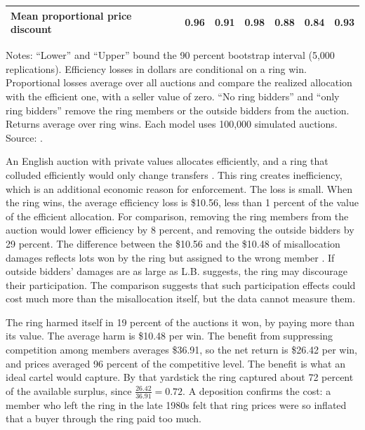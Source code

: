 \begin{table}[htbp]
\begin{threeparttable}
\begin{tabular}{@{}lrrrrrr@{}}
Mean proportional price discount & 0.96 & 0.91 & 0.98 & 0.88 & 0.84 & 0.93 \\
\bottomrule
\end{tabular}
\begin{tablenotes}\footnotesize
\item Notes: ``Lower'' and ``Upper'' bound the 90 percent bootstrap interval (5,000 replications). Efficiency
losses in dollars are conditional on a ring win. Proportional losses average over all auctions and compare the
realized allocation with the efficient one, with a seller value of zero. ``No ring bidders'' and ``only ring
bidders'' remove the ring members or the outside bidders from the auction. Returns average over ring wins. Each
model uses 100,000 simulated auctions. Source: \citet[Tables 8--10]{Asker2010}.
\end{tablenotes}
\end{threeparttable}
\end{table}

An English auction with private values allocates efficiently, and a ring that colluded efficiently would only
change transfers \citep{GrahamMarshall1987}. This ring creates inefficiency, which is an additional economic
reason for enforcement. The loss is small. When the ring wins, the average efficiency loss is \$10.56, less than 1
percent of the value of the efficient allocation. For comparison, removing the ring members from the auction would
lower efficiency by 8 percent, and removing the outside bidders by 29 percent. The difference between the \$10.56
and the \$10.48 of misallocation damages reflects lots won by the ring but assigned to the wrong member
\citep[footnote 49]{Asker2010}. If outside bidders' damages are as large as L.B. suggests, the ring may discourage
their participation. The comparison suggests that such participation effects could cost much more than the
misallocation itself, but the data cannot measure them.

The ring harmed itself in 19 percent of the auctions it won, by paying more than its value. The average harm is
\$10.48 per win. The benefit from suppressing competition among members averages \$36.91, so the net return is
\$26.42 per win, and prices averaged 96 percent of the competitive level. The benefit is what an ideal cartel would
capture. By that yardstick the ring captured about 72 percent of the available surplus, since
$\frac{26.42}{36.91}=0.72$. A deposition confirms the cost: a member who left the ring in the late 1980s felt that
ring prices were so inflated that a buyer through the ring paid too much.

